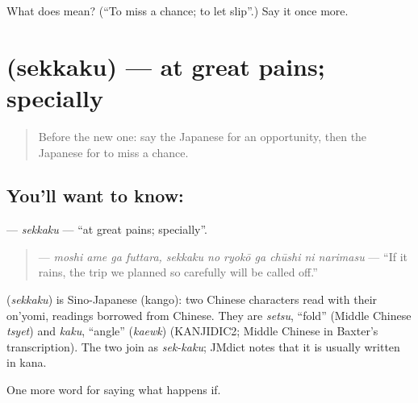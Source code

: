 \begin{tcolorbox}[breakable,colback=teal!4,colframe=teal!35!black,title={Before you move on}]
What does  mean? (\textquotedblleft{}To miss a chance; to let slip\textquotedblright{}.) Say it once more.
\end{tcolorbox}
\section[\texorpdfstring{\ja{せっかく} (sekkaku)}{せっかく (sekkaku)}]{ (sekkaku) — at great pains; specially}

\label{lesson:JA-C349-sekkaku}



\begin{quote}
Before the new one: say the Japanese for an opportunity, then the Japanese for to miss a chance.
\end{quote}

\subsection*{You'll want to know: }
\textbf{} — \emph{sekkaku} — \textquotedblleft{}at great pains; specially\textquotedblright{}.

\begin{quote}
\textbf{     } — \emph{moshi ame ga futtara, sekkaku no ryokō ga chūshi ni narimasu} — \textquotedblleft{}If it rains, the trip we planned so carefully will be called off.\textquotedblright{}
\end{quote}

\begin{cousinweb}
\textbf{} (\emph{sekkaku}) is Sino-Japanese (kango): two Chinese characters read with their on'yomi, readings borrowed from Chinese. They are \emph{setsu}, \textquotedblleft{}fold\textquotedblright{} (Middle Chinese \emph{tsyet}) and \emph{kaku}, \textquotedblleft{}angle\textquotedblright{} (\emph{kaewk}) (KANJIDIC2; Middle Chinese in Baxter's transcription). The two join as \emph{sek-kaku}; JMdict notes that it is usually written in kana.
\end{cousinweb}

\begin{grammarlens}[title={What you've built}]
One more word for saying what happens if.
\end{grammarlens}


